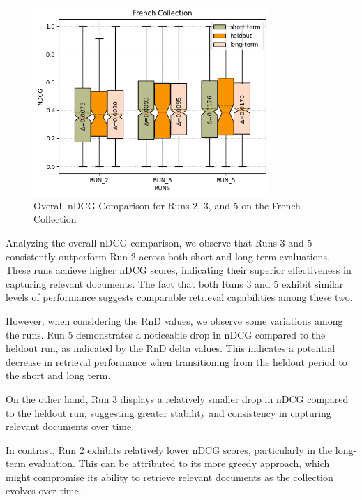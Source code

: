 \begin{figure}[!h]
\centering
\includegraphics[width=0.8\textwidth]{figure/StatisticalAnalysis/BoxPlot/NDGC French.png}
\caption{Overall \ac{nDCG} Comparison for Runs 2, 3, and 5 on the French Collection}
\label{fig:overall_ndcg_french_boxplot}
\end{figure}

Analyzing the overall \ac{nDCG} comparison, we observe that Runs 3 and 5 consistently outperform Run 2 across both short and long-term evaluations. 
These runs achieve higher \ac{nDCG} scores, indicating their superior effectiveness in capturing relevant documents. 
The fact that both Runs 3 and 5 exhibit similar levels of performance suggests comparable retrieval capabilities among these two.

However, when considering the \ac{RnD} values, we observe some variations among the runs. 
Run 5 demonstrates a noticeable drop in \ac{nDCG} compared to the heldout run, as indicated by the \ac{RnD} delta values. 
This indicates a potential decrease in retrieval performance when transitioning from the heldout period to the short and long term.

On the other hand, Run 3 displays a relatively smaller drop in \ac{nDCG} compared to the heldout run, suggesting greater stability and consistency in capturing relevant documents over time.

In contrast, Run 2 exhibits relatively lower \ac{nDCG} scores, particularly in the long-term evaluation. This can be attributed to its more greedy approach, which might compromise its ability to retrieve relevant documents as the collection evolves over time.


\newpage
\enlargethispage{5\baselineskip}
